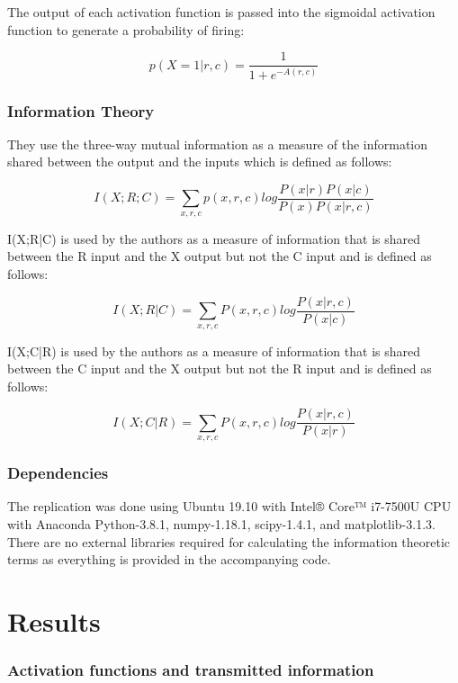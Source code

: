 The output of each activation function is passed into the sigmoidal activation function to generate a probability of firing:

\begin{equation}
p(X=1 | r,c) = \frac{1}{1 + e^{-A(r,c)}} 
\end{equation}


\subsubsection{Information Theory}
They use the three-way mutual information as a measure of the information shared between the output and the inputs which is defined as follows:

\begin{equation}
I(X;R;C) = \sum_{x,r,c}p(x,r,c)log\frac{P(x|r)P(x|c)}{P(x)P(x|r,c)}
\end{equation}

I(X;R|C) is used by the authors as a measure of information that is shared between the R input and the X output but not the C input and is defined as follows: 

\begin{equation}
I(X;R|C) = \sum_{x,r,c}P(x,r,c)log\frac{P(x|r,c)}{P(x|c)}
\end{equation}

I(X;C|R) is used by the authors as a measure of information that is shared between the C input and the X output but not the R input and is defined as follows:

\begin{equation}
I(X;C|R) = \sum_{x,r,c}P(x,r,c)log\frac{P(x|r,c)}{P(x|r)}
\end{equation}


\subsubsection{Dependencies} The replication was done using Ubuntu 19.10 with Intel® Core™ i7-7500U CPU with Anaconda Python-3.8.1, numpy-1.18.1, scipy-1.4.1, and matplotlib-3.1.3. There are no external libraries required for calculating the information theoretic terms as everything is provided in the accompanying code.

\section{Results}


\subsubsection{Activation functions and transmitted information}

